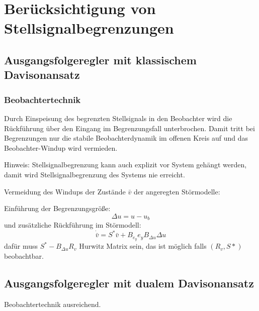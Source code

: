 \section{Berücksichtigung von Stellsignalbegrenzungen}
\subsection{Ausgangsfolgeregler mit klassischem Davisonansatz}
\subsubsection{Beobachtertechnik}
Durch Einspeisung des begrenzten Stellsignals in den Beobachter wird die Rückführung
über den Eingang im Begrenzungsfall unterbrochen. Damit tritt bei Begrenzungen nur die
stabile Beobachterdynamik im offenen Kreis auf und das Beobachter-Windup wird vermieden.

\vspace{.5cm}

Hinweis: Stellsignalbegrenzung kann auch explizit vor System gehängt werden, damit
wird Stellsignalbegrenzung des Systems nie erreicht.

\vspace{.5cm}

Vermeidung des Windups der Zustände $\bar{v}$ der angeregten Störmodelle:

Einführung der Begrenzungsgröße:
\begin{equation}
    \Delta u  = u - u_b
\end{equation}
und zusätzliche Rückführung im Störmodell:
\begin{equation}
    \dot{\bar{v}} = S^* \bar{v} + B_{e_y} e_y B_{\Delta u} \Delta u
\end{equation}
dafür muss $S^*-B_{\Delta u}R_v$ Hurwitz Matrix sein, das ist möglich falls $(R_v, S*)$
beobachtbar.

\subsection{Ausgangsfolgeregler mit dualem Davisonansatz}
Beobachtertechnik ausreichend.
